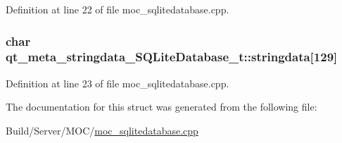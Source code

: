 Definition at line 22 of file moc\+\_\+sqlitedatabase.\+cpp.

\hypertarget{structqt__meta__stringdata___s_q_lite_database__t_affb2d396b23558365cc0835d252a736d}{}
\subsubsection[{stringdata}]{\setlength{\rightskip}{0pt plus 5cm}char qt\+\_\+meta\+\_\+stringdata\+\_\+\+S\+Q\+Lite\+Database\+\_\+t\+::stringdata\mbox{[}129\mbox{]}}\label{structqt__meta__stringdata___s_q_lite_database__t_affb2d396b23558365cc0835d252a736d}


Definition at line 23 of file moc\+\_\+sqlitedatabase.\+cpp.



The documentation for this struct was generated from the following file\+:\begin{DoxyCompactItemize}
\item 
Build/\+Server/\+M\+O\+C/\hyperlink{moc__sqlitedatabase_8cpp}{moc\+\_\+sqlitedatabase.\+cpp}\end{DoxyCompactItemize}
